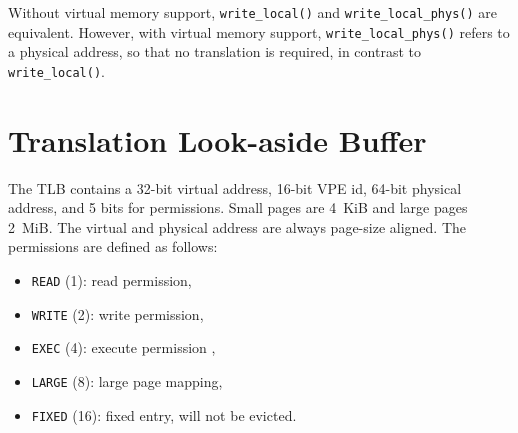 Without virtual memory support, \texttt{write\_local()} and \texttt{write\_local\_phys()} are
equivalent. However, with virtual memory support, \texttt{write\_local\_phys()} refers to a physical
address, so that no translation is required, in contrast to \texttt{write\_local()}.

\section{Translation Look-aside Buffer}
\label{sec:tlb}

The TLB contains a 32-bit virtual address, 16-bit VPE id, 64-bit physical address, and 5 bits for
permissions. Small pages are 4~KiB and large pages 2~MiB. The virtual and physical address are
always page-size aligned. The permissions are defined as follows:

\begin{itemize}
  \item \texttt{READ} (1): read permission,
  \item \texttt{WRITE} (2): write permission,
  \item \texttt{EXEC} (4): execute permission ,
  \item \texttt{LARGE} (8): large page mapping,
  \item \texttt{FIXED} (16): fixed entry, will not be evicted.
\end{itemize}
\extend{}

